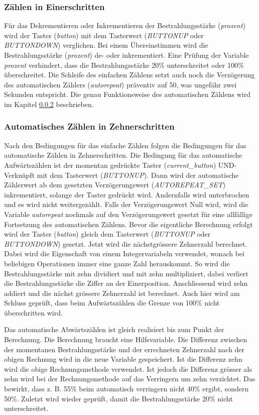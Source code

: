 \subsubsection{Zählen in Einerschritten}
Für das Dekrementieren oder Inkrementieren der Bestrahlungsstärke (\textit{prozent}) wird der Taster (\textit{button}) mit dem Tasterwert (\textit{BUTTONUP} oder \textit{BUTTONDOWN}) verglichen. Bei einem Übereinstimmen wird die Bestrahlungsstärke (\textit{prozent}) de- oder inkrementiert. Eine Prüfung der Variable \textit{prozent} verhindert, dass die Bestrahlungsstärke 20\% unterschreitet oder 100\% überschreitet. Die Schleife des einfachen Zählens setzt auch noch die Verzögerung des automatischen Zählers (\textit{autorepeat}) präventiv auf 50, was ungefähr zwei Sekunden entspricht. Die genau Funktionsweise des automatischen Zählens wird im Kapitel \ref{subsubsec_autocount} beschrieben.

\subsubsection{Automatisches Zählen in Zehnerschritten}\label{subsubsec_autocount}
Nach den Bedingungen für das einfache Zählen folgen die Bedingungen für das automatische Zählen in Zehnerschritten. Die Bedingung für das automatische Aufwärtszählen ist der momentan gedrückte Taster (\textit{current\_button}) UND-Verknüpft mit dem Tasterwert (\textit{BUTTONUP}). Dann wird der automatische Zählerwert ab dem gesetzten Verzögerungswert (\textit{AUTOREPEAT\_SET}) inkrementiert, solange der Taster gedrückt wird. Andernfalls wird unterbrochen und es wird nicht weitergezählt. Falls der Verzögerungswert Null wird, wird die Variable \textit{autorepeat} nochmals auf den Verzögerungswert gesetzt für eine allfällige Fortsetzung des automatischen Zählens. Bevor die eigentliche Berechnung erfolgt wird der Taster (\textit{button}) gleich dem Tasterwert (\textit{BUTTONUP} oder \textit{BUTTONDOWN}) gesetzt. Jetzt wird die nächstgrössere Zehnerzahl berechnet. Dabei wird die Eigenschaft von einem Integervariabeln verwendet, wonach bei beliebigen Operationen immer eine ganze Zahl herauskommt. So wird die Bestrahlungsstärke mit zehn dividiert und mit zehn multipliziert, dabei verliert die Bestrahlungsstärke die Ziffer an der Einerposition. Anschliessend wird zehn addiert und die nächst grössere Zehnerzahl ist berechnet. Auch hier wird am Schluss geprüft, dass beim Aufwärtszählen die Grenze von 100\% nicht überschritten wird.

Das automatische Abwärtszählen ist gleich realisiert bis zum Punkt der Berechnung. Die Berechnung braucht eine Hilfsvariable. Die Differenz zwischen der momentanen Bestrahlungsstärke und der errechneten Zehnerzahl nach der obigen Rechnung wird in die neue Variable gespeichert. Ist die Differenz zehn wird die obige Rechnungsmethode verwendet. Ist jedoch die Differenz grösser als zehn wird bei der Rechnungsmethode auf das Verringern um zehn verzichtet. Das bewirkt, dass z. B. 55\% beim automatisch verringern nicht 40\% ergibt, sondern 50\%. Zuletzt wird wieder geprüft, damit die Bestrahlungsstärke 20\% nicht unterschreitet.

